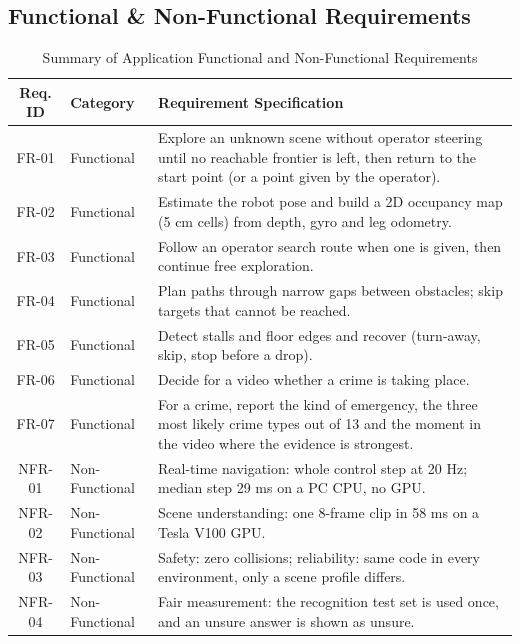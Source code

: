 \documentclass[11pt, a4paper]{article}
\begin{document}
\subsection{Functional \& Non-Functional Requirements}
\begin{table}[H]
    \centering
    \footnotesize
    \renewcommand{\arraystretch}{1.25}
    \begin{tabular}{|c|p{3.0cm}|p{9.2cm}|}
        \hline
        \textbf{Req. ID} & \textbf{Category} & \textbf{Requirement Specification} \\
        \hline
        FR-01 & Functional & Explore an unknown scene without operator steering until no reachable frontier is left, then return to the start point (or a point given by the operator). \\
        \hline
        FR-02 & Functional & Estimate the robot pose and build a 2D occupancy map (5 cm cells) from depth, gyro and leg odometry. \\
        \hline
        FR-03 & Functional & Follow an operator search route when one is given, then continue free exploration. \\
        \hline
        FR-04 & Functional & Plan paths through narrow gaps between obstacles; skip targets that cannot be reached. \\
        \hline
        FR-05 & Functional & Detect stalls and floor edges and recover (turn-away, skip, stop before a drop). \\
        \hline
        FR-06 & Functional & Decide for a video whether a crime is taking place. \\
        \hline
        FR-07 & Functional & For a crime, report the kind of emergency, the three most likely crime types out of 13 and the moment in the video where the evidence is strongest. \\
        \hline
        NFR-01 & Non-Functional & Real-time navigation: whole control step at 20 Hz; median step 29 ms on a PC CPU, no GPU. \\
        \hline
        NFR-02 & Non-Functional & Scene understanding: one 8-frame clip in 58 ms on a Tesla V100 GPU. \\
        \hline
        NFR-03 & Non-Functional & Safety: zero collisions; reliability: same code in every environment, only a scene profile differs. \\
        \hline
        NFR-04 & Non-Functional & Fair measurement: the recognition test set is used once, and an unsure answer is shown as unsure. \\
        \hline
    \end{tabular}
    \caption{Summary of Application Functional and Non-Functional Requirements}
\end{table}
\end{document}
